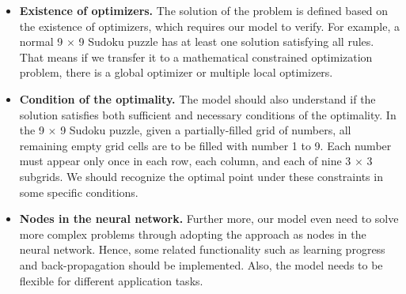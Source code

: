 \begin{itemize}
    \item \textbf{Existence of optimizers. }The solution of the problem is defined based on the existence of optimizers, which requires our model to verify. For example, a normal 9 $\times$ 9 Sudoku puzzle has at least one solution satisfying all rules. That means if we transfer it to a mathematical constrained optimization problem, there is a global optimizer or multiple local optimizers. 
    
    \item \textbf{Condition of the optimality. }The model should also understand if the solution satisfies both sufficient and necessary conditions of the optimality. In the 9 $\times$ 9 Sudoku puzzle, given a partially-filled grid of numbers, all remaining empty grid cells are to be filled with number 1 to 9. Each number must appear only once in each row, each column, and each of nine 3 $\times$ 3 subgrids. We should recognize the optimal point under these constraints in some specific conditions. 
    
    \item \textbf{Nodes in the neural network. }Further more, our model even need to solve more complex problems through adopting the approach as nodes in the neural network. Hence, some related functionality such as learning progress and back-propagation should be implemented. Also, the model needs to be flexible for different application tasks. 
\end{itemize}
